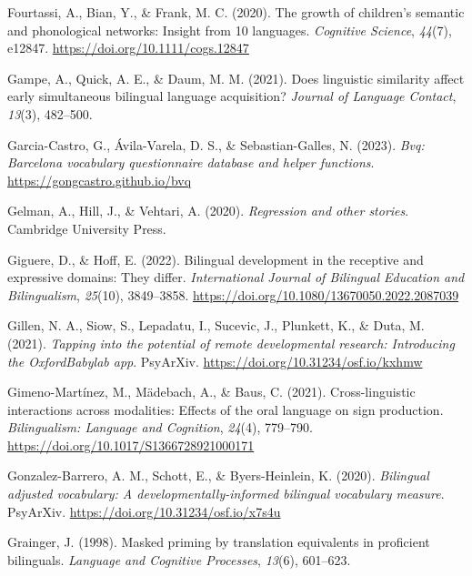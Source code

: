 \documentclass[
]{article}
\newlength{\cslhangindent}
\newlength{\cslentryspacingunit} %
\newenvironment{CSLReferences}[2] %
 {%
  \setlength{\parindent}{0pt}
  \ifodd #1
  \let\oldpar\par
  \def\par{\hangindent=\cslhangindent\oldpar}
  \fi
  \setlength{\parskip}{#2\cslentryspacingunit}
 }%
 {}
\begin{document}
\begin{CSLReferences}{1}{0}
\leavevmode{}%
Fourtassi, A., Bian, Y., \& Frank, M. C. (2020). The growth of
children's semantic and phonological networks: Insight from 10
languages. \emph{Cognitive Science}, \emph{44}(7), e12847.
\url{https://doi.org/10.1111/cogs.12847}

\leavevmode{}%
Gampe, A., Quick, A. E., \& Daum, M. M. (2021). Does linguistic
similarity affect early simultaneous bilingual language acquisition?
\emph{Journal of Language Contact}, \emph{13}(3), 482--500.

\leavevmode{}%
Garcia-Castro, G., Ávila-Varela, D. S., \& Sebastian-Galles, N. (2023).
\emph{Bvq: Barcelona vocabulary questionnaire database and helper
functions}. \url{https://gongcastro.github.io/bvq}

\leavevmode{}%
Gelman, A., Hill, J., \& Vehtari, A. (2020). \emph{Regression and other
stories}. Cambridge University Press.

\leavevmode{}%
Giguere, D., \& Hoff, E. (2022). Bilingual development in the receptive
and expressive domains: They differ. \emph{International Journal of
Bilingual Education and Bilingualism}, \emph{25}(10), 3849--3858.
\url{https://doi.org/10.1080/13670050.2022.2087039}

\leavevmode{}%
Gillen, N. A., Siow, S., Lepadatu, I., Sucevic, J., Plunkett, K., \&
Duta, M. (2021). \emph{Tapping into the potential of remote
developmental research: Introducing the {OxfordBabylab} app}.
{PsyArXiv}. \url{https://doi.org/10.31234/osf.io/kxhmw}

\leavevmode{}%
Gimeno-Martínez, M., Mädebach, A., \& Baus, C. (2021). Cross-linguistic
interactions across modalities: Effects of the oral language on sign
production. \emph{Bilingualism: Language and Cognition}, \emph{24}(4),
779--790. \url{https://doi.org/10.1017/S1366728921000171}

\leavevmode{}%
Gonzalez-Barrero, A. M., Schott, E., \& Byers-Heinlein, K. (2020).
\emph{Bilingual adjusted vocabulary: A developmentally-informed
bilingual vocabulary measure}. {PsyArXiv}.
\url{https://doi.org/10.31234/osf.io/x7s4u}

\leavevmode{}%
Grainger, J. (1998). Masked priming by translation equivalents in
proficient bilinguals. \emph{Language and Cognitive Processes},
\emph{13}(6), 601--623.


\end{CSLReferences}
\end{document}
